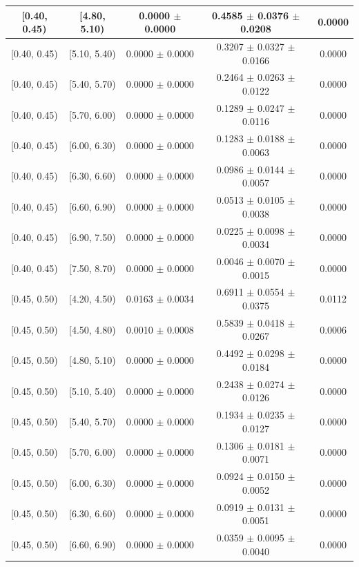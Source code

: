 \begin{longtable}{|c|c|c|c|c|}
\hline
[0.40, 0.45) & [4.80, 5.10) & 0.0000 $\pm$ 0.0000 & 0.4585 $\pm$ 0.0376 $\pm$ 0.0208 & 0.0000 \\ 
\hline
[0.40, 0.45) & [5.10, 5.40) & 0.0000 $\pm$ 0.0000 & 0.3207 $\pm$ 0.0327 $\pm$ 0.0166 & 0.0000 \\ 
\hline
[0.40, 0.45) & [5.40, 5.70) & 0.0000 $\pm$ 0.0000 & 0.2464 $\pm$ 0.0263 $\pm$ 0.0122 & 0.0000 \\ 
\hline
[0.40, 0.45) & [5.70, 6.00) & 0.0000 $\pm$ 0.0000 & 0.1289 $\pm$ 0.0247 $\pm$ 0.0116 & 0.0000 \\ 
\hline
[0.40, 0.45) & [6.00, 6.30) & 0.0000 $\pm$ 0.0000 & 0.1283 $\pm$ 0.0188 $\pm$ 0.0063 & 0.0000 \\ 
\hline
[0.40, 0.45) & [6.30, 6.60) & 0.0000 $\pm$ 0.0000 & 0.0986 $\pm$ 0.0144 $\pm$ 0.0057 & 0.0000 \\ 
\hline
[0.40, 0.45) & [6.60, 6.90) & 0.0000 $\pm$ 0.0000 & 0.0513 $\pm$ 0.0105 $\pm$ 0.0038 & 0.0000 \\ 
\hline
[0.40, 0.45) & [6.90, 7.50) & 0.0000 $\pm$ 0.0000 & 0.0225 $\pm$ 0.0098 $\pm$ 0.0034 & 0.0000 \\ 
\hline
[0.40, 0.45) & [7.50, 8.70) & 0.0000 $\pm$ 0.0000 & 0.0046 $\pm$ 0.0070 $\pm$ 0.0015 & 0.0000 \\ 
\hline
[0.45, 0.50) & [4.20, 4.50) & 0.0163 $\pm$ 0.0034 & 0.6911 $\pm$ 0.0554 $\pm$ 0.0375 & 0.0112 \\ 
\hline
[0.45, 0.50) & [4.50, 4.80) & 0.0010 $\pm$ 0.0008 & 0.5839 $\pm$ 0.0418 $\pm$ 0.0267 & 0.0006 \\ 
\hline
[0.45, 0.50) & [4.80, 5.10) & 0.0000 $\pm$ 0.0000 & 0.4492 $\pm$ 0.0298 $\pm$ 0.0184 & 0.0000 \\ 
\hline
[0.45, 0.50) & [5.10, 5.40) & 0.0000 $\pm$ 0.0000 & 0.2438 $\pm$ 0.0274 $\pm$ 0.0126 & 0.0000 \\ 
\hline
[0.45, 0.50) & [5.40, 5.70) & 0.0000 $\pm$ 0.0000 & 0.1934 $\pm$ 0.0235 $\pm$ 0.0127 & 0.0000 \\ 
\hline
[0.45, 0.50) & [5.70, 6.00) & 0.0000 $\pm$ 0.0000 & 0.1306 $\pm$ 0.0181 $\pm$ 0.0071 & 0.0000 \\ 
\hline
[0.45, 0.50) & [6.00, 6.30) & 0.0000 $\pm$ 0.0000 & 0.0924 $\pm$ 0.0150 $\pm$ 0.0052 & 0.0000 \\ 
\hline
[0.45, 0.50) & [6.30, 6.60) & 0.0000 $\pm$ 0.0000 & 0.0919 $\pm$ 0.0131 $\pm$ 0.0051 & 0.0000 \\ 
\hline
[0.45, 0.50) & [6.60, 6.90) & 0.0000 $\pm$ 0.0000 & 0.0359 $\pm$ 0.0095 $\pm$ 0.0040 & 0.0000 \\ 

\end{longtable}
